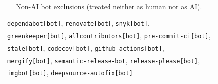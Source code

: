 \begin{table}[h]
\centering\footnotesize
\caption{Non-AI bot exclusions (treated neither as human nor as AI).}
\label{tab:non-ai-bots}
\begin{tabular}{@{}l@{}}
\toprule
\texttt{dependabot[bot]}, \texttt{renovate[bot]}, \texttt{snyk[bot]}, \\
\texttt{greenkeeper[bot]}, \texttt{allcontributors[bot]}, \texttt{pre-commit-ci[bot]}, \\
\texttt{stale[bot]}, \texttt{codecov[bot]}, \texttt{github-actions[bot]}, \\
\texttt{mergify[bot]}, \texttt{semantic-release-bot}, \texttt{release-please[bot]}, \\
\texttt{imgbot[bot]}, \texttt{deepsource-autofix[bot]} \\
\bottomrule
\end{tabular}
\end{table}
